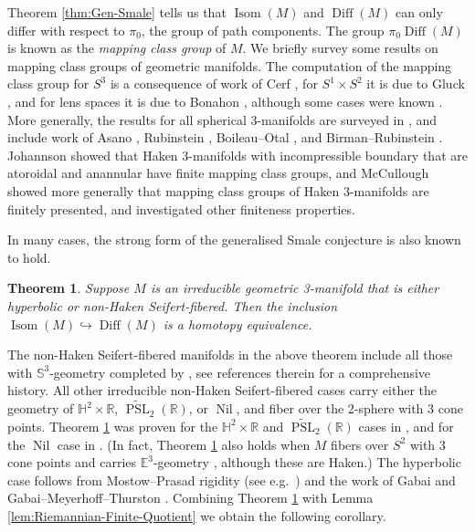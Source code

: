 \documentclass{amsart}
\theoremstyle{plain}
\newtheorem{thm}{Theorem}[section]
\theoremstyle{definition}
\DeclareMathOperator\Diff{Diff}
\DeclareMathOperator\Isom{Isom}
\DeclareMathOperator\PSL{PSL}
\DeclareMathOperator\Nil{Nil}
\newcommand{\bbR}{\mathbb{R}}
\newcommand{\bbS}{\mathbb{S}}
\newcommand{\bbH}{\mathbb{H}}
\newcommand{\bbE}{\mathbb{E}}
\begin{document}
Theorem \ref{thm:Gen-Smale} tells us that $\Isom(M)$ and $\Diff(M)$ can only differ with respect to $\pi_0$, the group of path components. The group $\pi_0\Diff(M)$ is known as the \emph{mapping class group} of $M$. We briefly survey some results on mapping class groups of geometric manifolds. The computation of the mapping class group for $S^3$ is a consequence of work of Cerf \cite{Cerf-Gamma4}, for $S^1\times S^2$ it is due to Gluck \cite{Gluck1962}, and for lens spaces it is due to Bonahon \cite{Bonahon1983}, although some cases were known \cite{Rubinstein1979,Ivanov79,Ivanov82,BirmanRubinstein1984}. More generally, the results for all spherical 3-manifolds are surveyed in \cite{HKMR12}, and include work of Asano \cite{Asano1978}, Rubinstein \cite{Rubinstein1978, Rubinstein1979}, Boileau--Otal \cite{BoileauOtal1986}, and Birman--Rubinstein \cite{BirmanRubinstein1984}.  Johannson \cite{Johannson1979} showed that Haken 3-manifolds with incompressible boundary that are atoroidal and anannular have finite mapping class groups, and McCullough \cite{McCullough1991} showed more generally that mapping class groups of Haken 3-manifolds are finitely presented, and investigated other finiteness properties.

In many cases, the strong form of the generalised Smale conjecture is also known to hold.
\begin{thm}\label{thm:Isom-Equivalence}
    Suppose $M$ is an irreducible geometric 3-manifold that is either hyperbolic or non-Haken Seifert-fibered.  Then the inclusion $\Isom(M)\hookrightarrow \Diff(M)$ is a homotopy equivalence. 
\end{thm}
The non-Haken Seifert-fibered manifolds in the above theorem include all those with $\bbS^3$-geometry completed by \cite{HKMR12,BK19,BK23}, see references therein for a comprehensive history.  All other irreducible non-Haken Seifert-fibered cases carry either the geometry of  $\bbH^2\times \bbR$, $\widetilde{\PSL}_2(\bbR)$, or $\Nil$, and fiber over the 2-sphere with 3 cone points. Theorem \ref{thm:Isom-Equivalence} was proven for the $\bbH^2\times \bbR$ and $\widetilde{\PSL}_2(\bbR)$ cases in \cite{McCulloughSoma13}, and for the $\Nil$ case in \cite{BamlerKleiner2023}.
(In fact, Theorem \ref{thm:Isom-Equivalence} also holds when $M$ fibers over $S^2$ with 3 cone points and carries $\bbE^3$-geometry \cite{McCulloughSoma13}, although these are Haken.)
The hyperbolic case follows from Mostow--Prasad rigidity (see e.g.~\cite{Gromov1979}) and the work of Gabai \cite{Gabai01} and Gabai--Meyerhoff--Thurston \cite{GMT03}.
Combining Theorem \ref{thm:Isom-Equivalence} with Lemma \ref{lem:Riemannian-Finite-Quotient} we obtain the following corollary.
\end{document}
